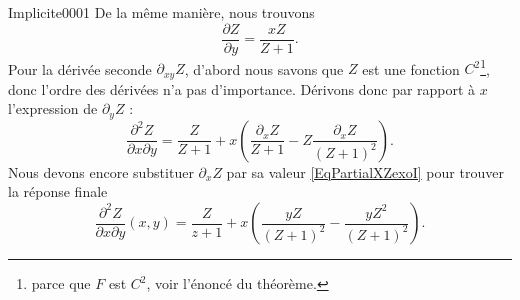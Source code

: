 \begin{corrige}{Implicite0001}
	De la même manière, nous trouvons
	\begin{equation}
		\frac{ \partial Z }{ \partial y }=\frac{ xZ }{ Z+1 }.
	\end{equation}
	Pour la dérivée seconde $\partial_{xy}Z$, d'abord nous savons que $Z$ est une fonction $C^2$\footnote{parce que $F$ est $C^2$, voir l'énoncé du théorème.}, donc l'ordre des dérivées n'a pas d'importance. Dérivons donc par rapport à $x$ l'expression de $\partial_yZ$ :
	\begin{equation}
		\frac{ \partial^2 Z }{ \partial x\partial y }=\frac{ Z }{ Z+1 }+x\left( \frac{ \partial_xZ }{ Z+1 }-Z\frac{ \partial_xZ }{ (Z+1)^2 } \right).
	\end{equation}
	Nous devons encore substituer $\partial_xZ$ par sa valeur \eqref{EqPartialXZexoI} pour trouver la réponse finale
	\begin{equation}
		\frac{ \partial^2 Z }{ \partial x\partial y  }(x,y)=\frac{ Z }{ z+1 }+x\left( \frac{ yZ }{ (Z+1)^2 }-\frac{ yZ^2 }{ (Z+1)^2 } \right).
	\end{equation}

\end{corrige}
